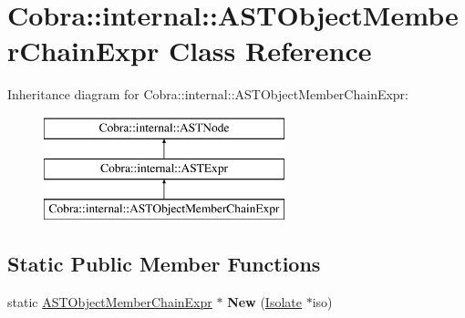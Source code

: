 \hypertarget{class_cobra_1_1internal_1_1_a_s_t_object_member_chain_expr}{\section{Cobra\+:\+:internal\+:\+:A\+S\+T\+Object\+Member\+Chain\+Expr Class Reference}
\label{class_cobra_1_1internal_1_1_a_s_t_object_member_chain_expr}
}
Inheritance diagram for Cobra\+:\+:internal\+:\+:A\+S\+T\+Object\+Member\+Chain\+Expr\+:\begin{figure}[H]
\begin{center}
\leavevmode
\includegraphics[height=3.000000cm]{class_cobra_1_1internal_1_1_a_s_t_object_member_chain_expr}
\end{center}
\end{figure}
\subsection*{Static Public Member Functions}
\begin{DoxyCompactItemize}
\item 
\hypertarget{class_cobra_1_1internal_1_1_a_s_t_object_member_chain_expr_afbd7d365b7a3308d61acf39bff6cd694}{static \hyperlink{class_cobra_1_1internal_1_1_a_s_t_object_member_chain_expr}{A\+S\+T\+Object\+Member\+Chain\+Expr} $\ast$ {\bfseries New} (\hyperlink{class_cobra_1_1internal_1_1_isolate}{Isolate} $\ast$iso)}\label{class_cobra_1_1internal_1_1_a_s_t_object_member_chain_expr_afbd7d365b7a3308d61acf39bff6cd694}

\end{DoxyCompactItemize}
